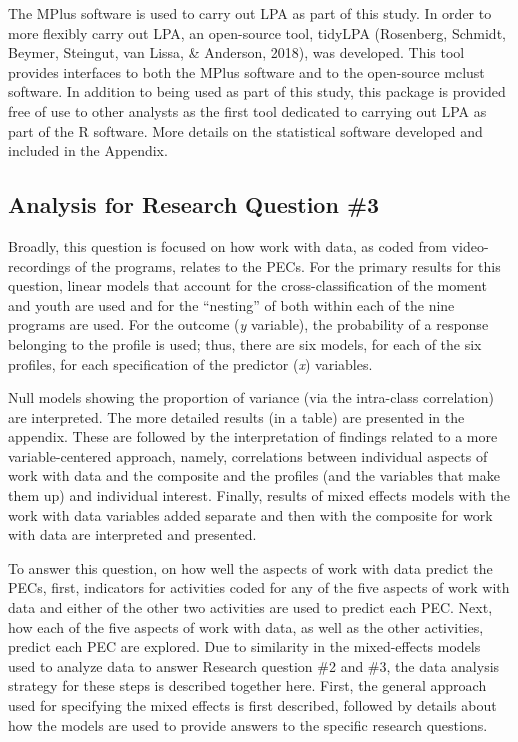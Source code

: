 \documentclass[]{msu-thesis}
\theoremstyle{definition}
\theoremstyle{definition}
\theoremstyle{definition}
\theoremstyle{remark}
\begin{document}
The MPlus software is used to carry out LPA as part of this study. In
order to more flexibly carry out LPA, an open-source tool, tidyLPA
(Rosenberg, Schmidt, Beymer, Steingut, van Lissa, \& Anderson, 2018),
was developed. This tool provides interfaces to both the MPlus software
and to the open-source mclust software. In addition to being used as
part of this study, this package is provided free of use to other
analysts as the first tool dedicated to carrying out LPA as part of the
R software. More details on the statistical software developed and
included in the Appendix.

\subsection{Analysis for Research Question
\#3}\label{analysis-for-research-question-3}

Broadly, this question is focused on how work with data, as coded from
video-recordings of the programs, relates to the PECs. For the primary
results for this question, linear models that account for the
cross-classification of the moment and youth are used and for the
``nesting'' of both within each of the nine programs are used. For the
outcome (\emph{y} variable), the probability of a response belonging to
the profile is used; thus, there are six models, for each of the six
profiles, for each specification of the predictor (\emph{x}) variables.

Null models showing the proportion of variance (via the intra-class
correlation) are interpreted. The more detailed results (in a table) are
presented in the appendix. These are followed by the interpretation of
findings related to a more variable-centered approach, namely,
correlations between individual aspects of work with data and the
composite and the profiles (and the variables that make them up) and
individual interest. Finally, results of mixed effects models with the
work with data variables added separate and then with the composite for
work with data are interpreted and presented.

To answer this question, on how well the aspects of work with data
predict the PECs, first, indicators for activities coded for any of the
five aspects of work with data and either of the other two activities
are used to predict each PEC. Next, how each of the five aspects of work
with data, as well as the other activities, predict each PEC are
explored. Due to similarity in the mixed-effects models used to analyze
data to answer Research question \#2 and \#3, the data analysis strategy
for these steps is described together here. First, the general approach
used for specifying the mixed effects is first described, followed by
details about how the models are used to provide answers to the specific
research questions.
\end{document}
